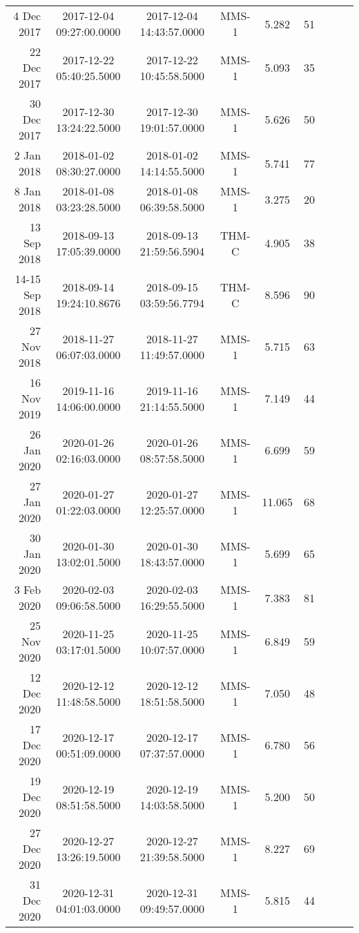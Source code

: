 \begin{longtable}{r|cccccccc}
4 Dec 2017     &  2017-12-04 09:27:00.0000 &  2017-12-04 14:43:57.0000 &  MMS-1 &    5.282 &     51 \\
22 Dec 2017    &  2017-12-22 05:40:25.5000 &  2017-12-22 10:45:58.5000 &  MMS-1 &    5.093 &     35 \\
30 Dec 2017    &  2017-12-30 13:24:22.5000 &  2017-12-30 19:01:57.0000 &  MMS-1 &    5.626 &     50 \\
2 Jan 2018     &  2018-01-02 08:30:27.0000 &  2018-01-02 14:14:55.5000 &  MMS-1 &    5.741 &     77 \\
8 Jan 2018     &  2018-01-08 03:23:28.5000 &  2018-01-08 06:39:58.5000 &  MMS-1 &    3.275 &     20 \\
13 Sep 2018    &  2018-09-13 17:05:39.0000 &  2018-09-13 21:59:56.5904 &  THM-C &    4.905 &     38 \\
14-15 Sep 2018 &  2018-09-14 19:24:10.8676 &  2018-09-15 03:59:56.7794 &  THM-C &    8.596 &     90 \\
27 Nov 2018    &  2018-11-27 06:07:03.0000 &  2018-11-27 11:49:57.0000 &  MMS-1 &    5.715 &     63 \\
16 Nov 2019    &  2019-11-16 14:06:00.0000 &  2019-11-16 21:14:55.5000 &  MMS-1 &    7.149 &     44 \\
26 Jan 2020    &  2020-01-26 02:16:03.0000 &  2020-01-26 08:57:58.5000 &  MMS-1 &    6.699 &     59 \\
27 Jan 2020    &  2020-01-27 01:22:03.0000 &  2020-01-27 12:25:57.0000 &  MMS-1 &   11.065 &     68 \\
30 Jan 2020    &  2020-01-30 13:02:01.5000 &  2020-01-30 18:43:57.0000 &  MMS-1 &    5.699 &     65 \\
3 Feb 2020     &  2020-02-03 09:06:58.5000 &  2020-02-03 16:29:55.5000 &  MMS-1 &    7.383 &     81 \\
25 Nov 2020    &  2020-11-25 03:17:01.5000 &  2020-11-25 10:07:57.0000 &  MMS-1 &    6.849 &     59 \\
12 Dec 2020    &  2020-12-12 11:48:58.5000 &  2020-12-12 18:51:58.5000 &  MMS-1 &    7.050 &     48 \\
17 Dec 2020    &  2020-12-17 00:51:09.0000 &  2020-12-17 07:37:57.0000 &  MMS-1 &    6.780 &     56 \\
19 Dec 2020    &  2020-12-19 08:51:58.5000 &  2020-12-19 14:03:58.5000 &  MMS-1 &    5.200 &     50 \\
27 Dec 2020    &  2020-12-27 13:26:19.5000 &  2020-12-27 21:39:58.5000 &  MMS-1 &    8.227 &     69 \\
31 Dec 2020    &  2020-12-31 04:01:03.0000 &  2020-12-31 09:49:57.0000 &  MMS-1 &    5.815 &     44 \\

\end{longtable}
